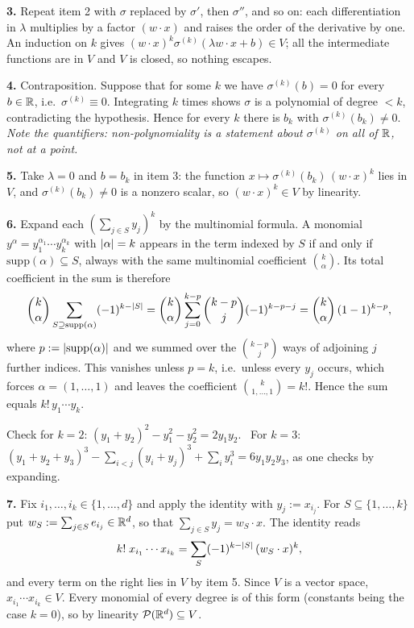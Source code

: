 \documentclass[11pt,a4paper]{article}
\begin{document}
\textbf{3.} Repeat item 2 with $\sigma$ replaced by $\sigma'$, then $\sigma''$, and so on: each
differentiation in $\lambda$ multiplies by a factor $(w\cdot x)$ and raises the order of the
derivative by one. An induction on $k$ gives
$(w\cdot x)^k\sigma^{(k)}(\lambda w\cdot x + b)\in V$; all the intermediate functions are in $V$ and
$V$ is closed, so nothing escapes.

\textbf{4.} Contraposition. Suppose that for some $k$ we have $\sigma^{(k)}(b) = 0$ for every
$b\in\mathbb{R}$, i.e.\ $\sigma^{(k)}\equiv0$. Integrating $k$ times shows $\sigma$ is a polynomial of
degree $< k$, contradicting the hypothesis. Hence for every $k$ there is $b_k$ with
$\sigma^{(k)}(b_k)\ne0$. \emph{Note the quantifiers: non-polynomiality is a statement about
$\sigma^{(k)}$ on all of $\mathbb{R}$, not at a point.}

\textbf{5.} Take $\lambda = 0$ and $b = b_k$ in item 3: the function
$x\mapsto \sigma^{(k)}(b_k)\,(w\cdot x)^k$ lies in $V$, and $\sigma^{(k)}(b_k)\ne0$ is a nonzero
scalar, so $(w\cdot x)^k \in V$ by linearity.

\textbf{6.} Expand each $(\sum_{j\in S}y_j)^k$ by the multinomial formula. A monomial
$y^\alpha = y_1^{\alpha_1}\cdots y_k^{\alpha_k}$ with $\left\lvert \alpha \right\rvert = k$ appears in the term indexed
by $S$ if and only if $\mathrm{supp}(\alpha)\subseteq S$, always with the same multinomial
coefficient $\binom{k}{\alpha}$. Its total coefficient in the sum is therefore
\[
\binom{k}{\alpha}\sum_{S \supseteq \mathrm{supp}(\alpha)}(-1)^{k-\left\lvert S \right\rvert}
= \binom{k}{\alpha}\sum_{j=0}^{k-p}\binom{k-p}{j}(-1)^{k-p-j}
= \binom{k}{\alpha}\,(1-1)^{k-p},
\]
where $p := \left\lvert \mathrm{supp}(\alpha) \right\rvert$ and we summed over the $\binom{k-p}{j}$ ways of adjoining
$j$ further indices. This vanishes unless $p = k$, i.e.\ unless every $y_j$ occurs, which forces
$\alpha = (1,\dots,1)$ and leaves the coefficient $\binom{k}{1,\dots,1} = k!$. Hence the sum equals
$k!\,y_1\cdots y_k$.

Check for $k=2$: $(y_1+y_2)^2 - y_1^2 - y_2^2 = 2y_1y_2$. \checkmark\ For $k = 3$:
$(y_1+y_2+y_3)^3 - \sum_{i<j}(y_i+y_j)^3 + \sum_i y_i^3 = 6y_1y_2y_3$, as one checks by expanding.

\textbf{7.} Fix $i_1,\dots,i_k\in\{1,\dots,d\}$ and apply the identity with $y_j := x_{i_j}$. For
$S\subseteq\{1,\dots,k\}$ put $w_S := \sum_{j\in S}e_{i_j}\in\mathbb{R}^d$, so that
$\sum_{j\in S}y_j = w_S\cdot x$. The identity reads
\[
k!\;x_{i_1}\cdots x_{i_k} = \sum_{S}(-1)^{k-\left\lvert S \right\rvert}\,(w_S\cdot x)^k,
\]
and every term on the right lies in $V$ by item 5. Since $V$ is a vector space,
$x_{i_1}\cdots x_{i_k}\in V$. Every monomial of every degree is of this form (constants being the
case $k=0$), so by linearity $\mathcal{P}(\mathbb{R}^d)\subseteq V$.
\end{document}
